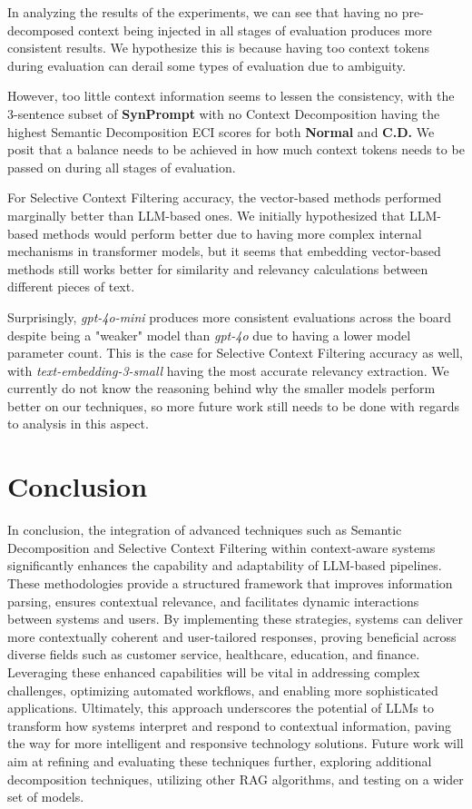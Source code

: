 In analyzing the results of the experiments, we can see that having no pre-decomposed context being injected in all stages of evaluation produces more consistent results. We hypothesize this is because having too context tokens during evaluation can derail some types of evaluation due to ambiguity. 

However, too little context information seems to lessen the consistency, with the 3-sentence subset of \textbf{SynPrompt} with no Context Decomposition having the highest Semantic Decomposition ECI scores for both \textbf{Normal} and \textbf{C.D.} We posit that a balance needs to be achieved in how much context tokens needs to be passed on during all stages of evaluation. 

For Selective Context Filtering accuracy, the vector-based methods performed marginally better than LLM-based ones. We initially hypothesized that LLM-based methods would perform better due to having more complex internal mechanisms in transformer models, but it seems that embedding vector-based methods still works better for similarity and relevancy calculations between different pieces of text.

Surprisingly, \textit{gpt-4o-mini} produces more consistent evaluations across the board despite being a "weaker" model than \textit{gpt-4o} due to having a lower model parameter count. This is the case for Selective Context Filtering accuracy as well, with \textit{text-embedding-3-small} having the most accurate relevancy extraction. We currently do not know the reasoning behind why the smaller models perform better on our techniques, so more future work still needs to be done with regards to analysis in this aspect.

\section{Conclusion}

In conclusion, the integration of advanced techniques such as Semantic Decomposition and Selective Context Filtering within context-aware systems significantly enhances the capability and adaptability of LLM-based pipelines. These methodologies provide a structured framework that improves information parsing, ensures contextual relevance, and facilitates dynamic interactions between systems and users. By implementing these strategies, systems can deliver more contextually coherent and user-tailored responses, proving beneficial across diverse fields such as customer service, healthcare, education, and finance. Leveraging these enhanced capabilities will be vital in addressing complex challenges, optimizing automated workflows, and enabling more sophisticated applications. Ultimately, this approach underscores the potential of LLMs to transform how systems interpret and respond to contextual information, paving the way for more intelligent and responsive technology solutions. Future work will aim at refining and evaluating these techniques further, exploring additional decomposition techniques, utilizing other RAG algorithms, and testing on a wider set of models. 